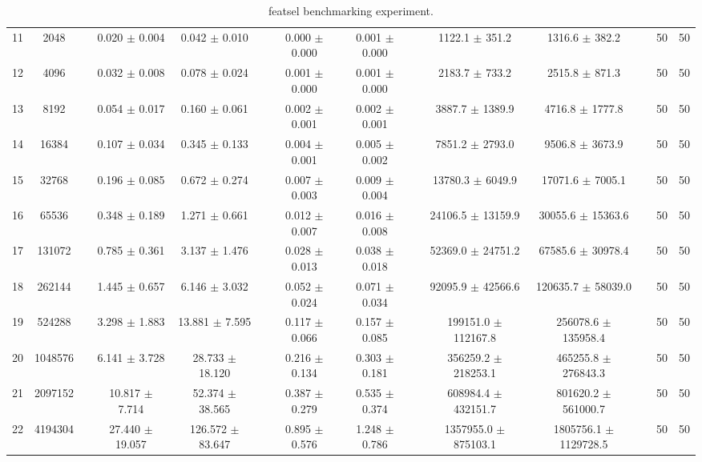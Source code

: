 \documentclass[11pt]{article}
\begin{document}
\begin{landscape}
\begin{table}
\begin{tabular}{cccccccccccccc}
11 &    2048 &&  0.020 $\pm$ 0.004 & 0.042 $\pm$ 0.010 &&  0.000 $\pm$ 0.000 & 0.001 $\pm$ 0.000 &&  1122.1 $\pm$ 351.2 & 1316.6 $\pm$ 382.2 && 50& 50\\
12 &    4096 &&  0.032 $\pm$ 0.008 & 0.078 $\pm$ 0.024 &&  0.001 $\pm$ 0.000 & 0.001 $\pm$ 0.000 &&  2183.7 $\pm$ 733.2 & 2515.8 $\pm$ 871.3 && 50& 50\\
13 &    8192 &&  0.054 $\pm$ 0.017 & 0.160 $\pm$ 0.061 &&  0.002 $\pm$ 0.001 & 0.002 $\pm$ 0.001 &&  3887.7 $\pm$ 1389.9 & 4716.8 $\pm$ 1777.8 && 50& 50\\
14 &   16384 &&  0.107 $\pm$ 0.034 & 0.345 $\pm$ 0.133 &&  0.004 $\pm$ 0.001 & 0.005 $\pm$ 0.002 &&  7851.2 $\pm$ 2793.0 & 9506.8 $\pm$ 3673.9 && 50& 50\\
15 &   32768 &&  0.196 $\pm$ 0.085 & 0.672 $\pm$ 0.274 &&  0.007 $\pm$ 0.003 & 0.009 $\pm$ 0.004 &&  13780.3 $\pm$ 6049.9 & 17071.6 $\pm$ 7005.1 && 50& 50\\
16 &   65536 &&  0.348 $\pm$ 0.189 & 1.271 $\pm$ 0.661 &&  0.012 $\pm$ 0.007 & 0.016 $\pm$ 0.008 &&  24106.5 $\pm$ 13159.9 & 30055.6 $\pm$ 15363.6 && 50& 50\\
17 &  131072 &&  0.785 $\pm$ 0.361 & 3.137 $\pm$ 1.476 &&  0.028 $\pm$ 0.013 & 0.038 $\pm$ 0.018 &&  52369.0 $\pm$ 24751.2 & 67585.6 $\pm$ 30978.4 && 50& 50\\
18 &  262144 &&  1.445 $\pm$ 0.657 & 6.146 $\pm$ 3.032 &&  0.052 $\pm$ 0.024 & 0.071 $\pm$ 0.034 &&  92095.9 $\pm$ 42566.6 & 120635.7 $\pm$ 58039.0 && 50& 50\\
19 &  524288 &&  3.298 $\pm$ 1.883 & 13.881 $\pm$ 7.595 &&  0.117 $\pm$ 0.066 & 0.157 $\pm$ 0.085 &&  199151.0 $\pm$ 112167.8 & 256078.6 $\pm$ 135958.4 && 50& 50\\
20 & 1048576 &&  6.141 $\pm$ 3.728 & 28.733 $\pm$ 18.120 &&  0.216 $\pm$ 0.134 & 0.303 $\pm$ 0.181 &&  356259.2 $\pm$ 218253.1 & 465255.8 $\pm$ 276843.3 && 50& 50\\
21 & 2097152 &&  10.817 $\pm$ 7.714 & 52.374 $\pm$ 38.565 &&  0.387 $\pm$ 0.279 & 0.535 $\pm$ 0.374 &&  608984.4 $\pm$ 432151.7 & 801620.2 $\pm$ 561000.7 && 50& 50\\
22 & 4194304 &&  27.440 $\pm$ 19.057 & 126.572 $\pm$ 83.647 &&  0.895 $\pm$ 0.576 & 1.248 $\pm$ 0.786 &&  1357955.0 $\pm$ 875103.1 & 1805756.1 $\pm$ 1129728.5 && 50& 50\\
\bottomrule \end{tabular}
\caption{featsel benchmarking experiment.} \label{tab:featsel}
\end{table}
\end{landscape}
\end{document}
